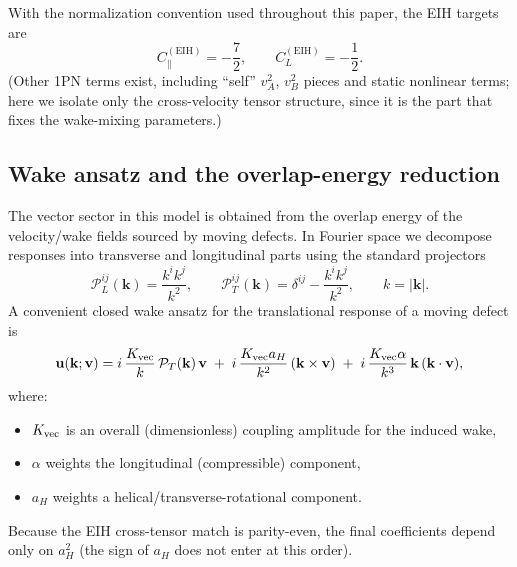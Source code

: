 \documentclass[11pt]{article}
\begin{document}
With the normalization convention used throughout this paper, the EIH targets are
\begin{equation}
C_\parallel^{\mathrm{(EIH)}}=-\frac{7}{2},
\qquad
C_L^{\mathrm{(EIH)}}=-\frac{1}{2}.
\label{eq:eih-targets}
\end{equation}
(Other 1PN terms exist, including ``self'' \(v_A^2\), \(v_B^2\) pieces and static nonlinear
terms; here we isolate only the cross-velocity tensor structure, since it is the part
that fixes the wake-mixing parameters.)

\subsection{Wake ansatz and the overlap-energy reduction}
The vector sector in this model is obtained from the overlap energy of the
velocity/wake fields sourced by moving defects. In Fourier space we decompose
responses into transverse and longitudinal parts using the standard projectors
\begin{equation}
\mathcal{P}_L^{ij}(\mathbf{k}) = \frac{k^i k^j}{k^2},
\qquad
\mathcal{P}_T^{ij}(\mathbf{k}) = \delta^{ij} - \frac{k^i k^j}{k^2},
\qquad k = |\mathbf{k}|.
\label{eq:helmholtz-projectors}
\end{equation}
A convenient closed wake ansatz for the translational response of a moving defect is
\begin{equation}
\mathbf{u}(\mathbf{k};\mathbf{v}) =
i\,\frac{K_{\rm vec}}{k}\,\mathcal{P}_T(\mathbf{k})\,\mathbf{v}
\;+\;
i\,\frac{K_{\rm vec} a_H}{k^2}\,(\mathbf{k}\times\mathbf{v})
\;+\;
i\,\frac{K_{\rm vec}\alpha}{k^3}\,\mathbf{k}\,(\mathbf{k}\cdot\mathbf{v}),
\label{eq:wake-ansatz-k}
\end{equation}
where:
\begin{itemize}
\item \(K_{\rm vec}\) is an overall (dimensionless) coupling amplitude for the induced wake,
\item \(\alpha\) weights the longitudinal (compressible) component,
\item \(a_H\) weights a helical/transverse-rotational component.
\end{itemize}
Because the EIH cross-tensor match is parity-even, the final coefficients depend only on
\(a_H^2\) (the sign of \(a_H\) does not enter at this order).
\end{document}
